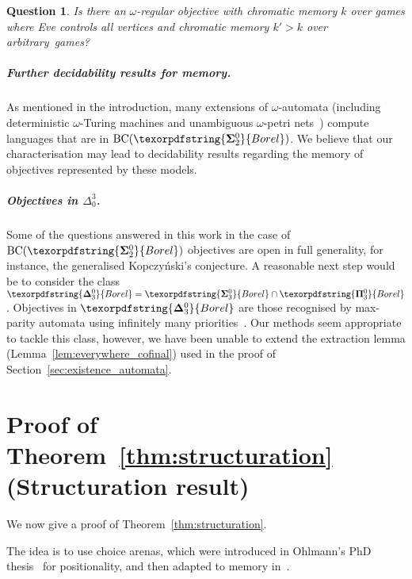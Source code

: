 \documentclass[a4paper,UKenglish,cleveref, thm-restate]{lipics-v2021}
\newtheorem{question}{Question}
\newcommand{\boldclass}[3]{\texorpdfstring{\ensuremath{\mathbf{#1}^{#2}_{#3}}}{Borel}}
\newcommand{\bsigma}[1]{\boldclass{\Sigma}{0}{#1}}
\newcommand{\bpi}[1]{\boldclass{\Pi}{0}{#1}}
\newcommand{\bdelta}[1]{\boldclass{\Delta}{0}{#1}}
\newcommand{\BCSigma}{\mathrm{BC}(\boldclass{\Sigma}{0}{2})}
\newcommand{\oo}{\omega}
\begin{document}
\begin{question}
	Is there an $\oo$-regular objective  with chromatic memory $k$ over games where Eve controls all vertices and chromatic memory $k'>k$ over arbitrary~games?
\end{question}


\subparagraph*{Further decidability results for memory.} As mentioned in the introduction, many extensions of $\oo$-automata (including deterministic $\oo$-Turing machines and unambiguous $\oo$-petri nets~\cite{FSJLS22}) compute languages that are in $\BCSigma$.
We believe that our characterisation may lead to decidability results regarding the memory of objectives represented by these models.

\subparagraph*{Objectives in $\Delta_0^3$.} Some of the questions answered in this work in the case of $\BCSigma$ objectives are open in full generality, for instance, the generalised Kopczy\'nski's conjecture. A reasonable next step would be to consider the class $\bdelta 3 = \bsigma 3 \cap \bpi 3$.
Objectives in $\bdelta 3$ are those recognised by max-parity automata using infinitely many priorities~\cite{Skrzypczak13Colorings}.
Our methods seem appropriate to tackle this class, however, we have been unable to extend the extraction lemma (Lemma~\ref{lem:everywhere_cofinal}) used in the proof of Section~\ref{sec:existence_automata}.



 




\newpage
\appendix


\section{Proof of Theorem~\ref{thm:structuration} (Structuration result)}\label{app:structuration}

We now give a proof of Theorem~\ref{thm:structuration}.

\structuration*

The idea is to use choice arenas, which were introduced in Ohlmann's PhD thesis~\cite[Section 3.2 in Chapter 3]{Ohlmann21PhD} for positionality, and then adapted to memory in~\cite{CO24Positional}.
\end{document}

